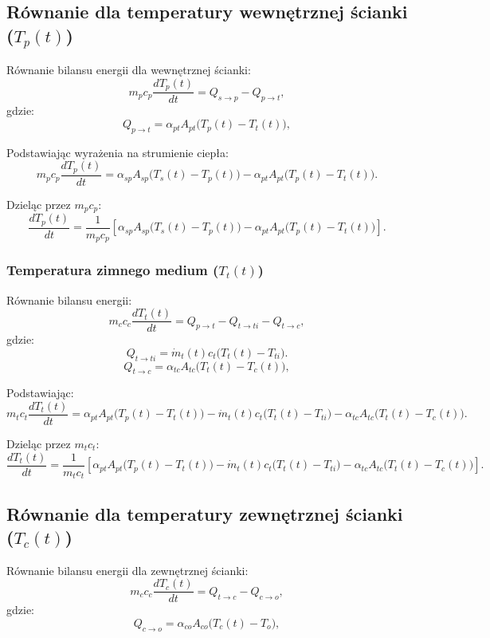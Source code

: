 \documentclass{article}
\begin{document}
	
	
	\subsection*{Równanie dla temperatury wewnętrznej ścianki (\( T_p(t) \))}
	
	Równanie bilansu energii dla wewnętrznej ścianki:
	\[
	m_p c_p \frac{dT_p(t)}{dt} = {Q}_{s \to p} - {Q}_{p \to t},
	\]
	gdzie:
	\[
	{Q}_{p \to t} = \alpha_{pt} A_{pt} \big(T_p(t) - T_t(t)\big),
	\]
	
	Podstawiając wyrażenia na strumienie ciepła:
	\[
	m_p c_p \frac{dT_p(t)}{dt} = \alpha_{sp} A_{sp} \big(T_s(t) - T_p(t)\big) -\alpha_{pt} A_{pt} \big(T_p(t) - T_t(t)\big).
	\]
	
	Dzieląc przez \( m_p c_p \):
	\[
	\frac{dT_p(t)}{dt} = \frac{1}{m_p c_p} \left[ \alpha_{sp} A_{sp} \big(T_s(t) - T_p(t)\big) -\alpha_{pt} A_{pt} \big(T_p(t) - T_t(t)\big) \right].
	\]
	
	\subsubsection*{Temperatura zimnego medium (\( T_t(t) \))}
	
	Równanie bilansu energii:
	\[
	m_c c_c \frac{dT_t(t)}{dt} = {Q}_{p \to t} -{Q}_{t \to ti}-{Q}_{t \to c} ,
	\]
	gdzie:
	\[
	{Q}_{t \to ti} = \dot{m}_t (t) c_t \big(T_t(t) - T_{ti} \big).
	\]
	\[
	{Q}_{t \to c} = \alpha_{tc} A_{tc} \big(T_t(t) - T_c(t)\big),
	\]
	
	
	Podstawiając:
	\[
	m_t c_t \frac{dT_t(t)}{dt} = \alpha_{pt} A_{pt} \big(T_p(t) - T_t(t)\big) -  \dot{m}_t (t) c_t \big(T_t(t) - T_{ti} \big) -\alpha_{tc} A_{tc} \big(T_t(t) - T_c(t)\big).
	\]
	
	Dzieląc przez \( m_t c_t \):
	\[
	\frac{dT_t(t)}{dt} = \frac{1}{m_t c_t} \left[ \alpha_{pt} A_{pt} \big(T_p(t) - T_t(t)\big) -  \dot{m}_t (t) c_t \big(T_t(t) - T_{ti} \big) -\alpha_{tc} A_{tc} \big(T_t(t) - T_c(t)\big) \right].
	\]
	
	\subsection*{Równanie dla temperatury zewnętrznej ścianki (\( T_c(t) \))}
	
	Równanie bilansu energii dla zewnętrznej ścianki:
	\[
	m_c c_c \frac{dT_c(t)}{dt} = {Q}_{t \to c} - {Q}_{c \to o},
	\]
	gdzie:
	\[
	{Q}_{c \to o} = \alpha_{co} A_{co} \big(T_c(t) - T_o\big),
	\]
	
\end{document}
